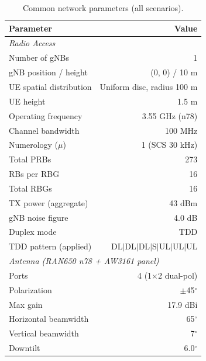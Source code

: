 
\begin{table}[H]
\centering
\caption{Common network parameters (all scenarios).}
\label{tab:net_params}
\begin{tabular}{lr}
\toprule
\textbf{Parameter} & \textbf{Value} \\
\midrule
\multicolumn{2}{l}{\textit{Radio Access}} \\
Number of gNBs               & 1 \\
gNB position / height        & (0, 0) / 10 m \\
UE spatial distribution      & Uniform disc, radius 100 m \\
UE height                    & 1.5 m \\
Operating frequency          & 3.55 GHz (n78) \\
Channel bandwidth            & 100 MHz \\
Numerology ($\mu$)           & 1 (SCS 30 kHz) \\
Total PRBs                   & 273 \\
RBs per RBG                  & 16 \\
Total RBGs                   & 16 \\
TX power (aggregate)         & 43 dBm \\
gNB noise figure             & 4.0 dB \\
Duplex mode                  & TDD \\
TDD pattern (applied)        & DL$|$DL$|$DL$|$S$|$UL$|$UL$|$UL \\
\midrule
\multicolumn{2}{l}{\textit{Antenna (RAN650 n78 + AW3161 panel)}} \\
Ports                        & 4 (1$\times$2 dual-pol) \\
Polarization                 & $\pm$45$^\circ$ \\
Max gain                     & 17.9 dBi \\
Horizontal beamwidth         & 65$^\circ$ \\
Vertical beamwidth           & 7$^\circ$ \\
Downtilt                     & 6.0$^\circ$ \\

\end{tabular}
\end{table}
